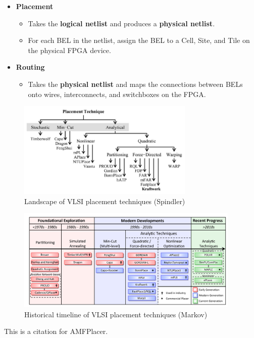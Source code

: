 \documentclass{article}
\begin{document}
\begin{itemize}[label={\textbullet}, left=0.25cm]
    \item \textbf{Placement}
    \begin{itemize}[label={--}, left=0.25cm]
        \item Takes the \textbf{logical netlist} and produces a \textbf{physical netlist}.
        \item For each BEL in the netlist, assign the BEL to a Cell, Site, and Tile on the physical FPGA device.
    \end{itemize}

    \item \textbf{Routing}
    \begin{itemize}[label={--}, left=0.25cm]
        \item Takes the \textbf{physical netlist} and maps the connections between BELs onto wires, interconnects, and switchboxes on the FPGA.
    \end{itemize}

\end{itemize}

\newpage
\begin{figure}
    \begin{center}
        \includegraphics[width=0.75\textwidth]{figures/kraftwerk2.png}
    \end{center}
    \caption{Landscape of VLSI placement techniques (Spindler) \cite{kraftwerk2} }
    \label{fig:kraftwerk2}
\end{figure}
\begin{figure}
    \begin{center}
        \includegraphics[width=0.95\textwidth]{figures/ProCha.png}
    \end{center}
    \caption{Historical timeline of VLSI placement techniques (Markov) \cite{ProCha} }
    \label{fig:ProCha}
\end{figure}

This is a citation for AMFPlacer. \cite{AMFPlacer}

\newpage

\nocite{*}

\end{document}
